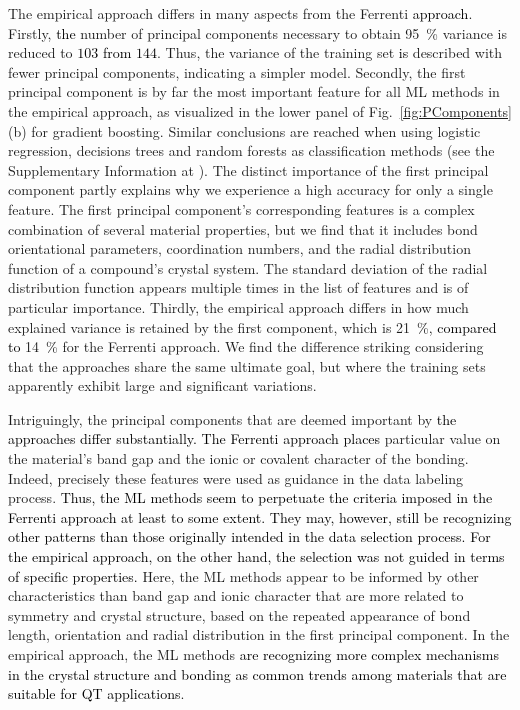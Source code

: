 \documentclass[superscriptaddress,unsortedaddress,
 amsmath,amssymb,
 aps,
]{revtex4-2}
\newcommand{\mrk}[1]{\textcolor{black}{#1}}
\begin{document}
The empirical approach differs in many aspects from the Ferrenti \mrk{approach}. 
Firstly, \mrk{the} number of principal components necessary to obtain \SI{95}{\percent} variance is reduced to \mrk{$103$ from $144$}. 
Thus, the variance of the training set \mrk{is} described with fewer principal components, indicating a simpler model. Secondly, the first principal component is by far the most important feature for all ML methods in the empirical approach, as visualized in the lower panel of Fig.~\ref{fig:PComponents}(b) for gradient boosting. Similar conclusions are reached when using logistic regression, decisions trees and random forests as classification methods (see the Supplementary Information at \cite{supplementary}). 
The distinct importance of the first principal component partly explains why we experience a high accuracy for only a single feature. The first principal component's corresponding features is a complex combination of several material properties, but we find that it includes bond orientational parameters, coordination numbers, and the radial distribution function of a compound's crystal system. 
The standard deviation of the radial distribution function appears multiple times in the list of features and is of particular importance. 
Thirdly, the empirical approach differs in how much explained variance is retained by the first component, which is \SI{21}{\percent}, \mrk{compared to} \SI{14}{\percent} for the Ferrenti approach. 
We find the difference striking considering that the approaches share the same ultimate goal, but where the training sets apparently exhibit large and significant variations. 

Intriguingly, the principal components that are deemed important by \mrk{the approaches differ substantially. The Ferrenti approach places}  particular value on the material's band gap and the ionic or covalent character of the bonding. Indeed, precisely these features were used as guidance in the data labeling process. \mrk{Thus, the ML methods seem to perpetuate the criteria imposed in the Ferrenti approach at least to some extent. They may, however, still be recognizing other patterns than those originally intended in the data selection process.} \mrk{For the empirical approach, on the other hand, the selection was not guided in terms of specific properties.} Here, the ML methods appear to be informed by other characteristics than band gap and ionic character that are more related to symmetry and crystal structure, based on the repeated appearance of bond length, orientation and radial distribution in the first principal component. In the empirical approach, the ML methods \mrk{are recognizing more complex mechanisms in the crystal structure and bonding as common trends among materials that are suitable for QT applications}.  
\end{document}
